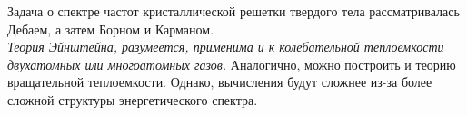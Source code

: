 Задача о спектре частот кристаллической решетки твердого тела рассматривалась Дебаем, а затем Борном и Карманом. \\ [0.2cm]

\textit {Теория Эйнштейна, разумеется, применима и к колебательной теплоемкости двухатомных или многоатомных газов.} Аналогично, можно построить и теорию вращательной теплоемкости. Однако, вычисления будут сложнее из-за более сложной структуры энергетического спектра.